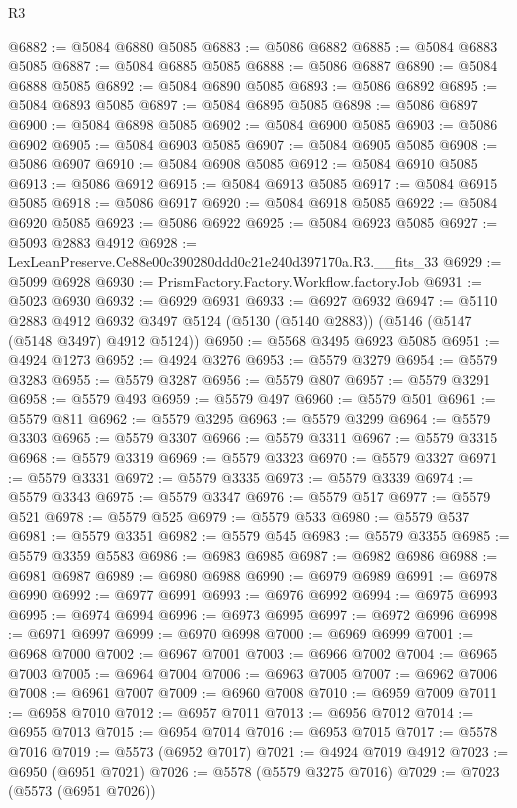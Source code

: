 \begin{lexlean}{R3}
\begin{coremodule}
@6882 := @5084 @6880 @5085
@6883 := @5086 @6882
@6885 := @5084 @6883 @5085
@6887 := @5084 @6885 @5085
@6888 := @5086 @6887
@6890 := @5084 @6888 @5085
@6892 := @5084 @6890 @5085
@6893 := @5086 @6892
@6895 := @5084 @6893 @5085
@6897 := @5084 @6895 @5085
@6898 := @5086 @6897
@6900 := @5084 @6898 @5085
@6902 := @5084 @6900 @5085
@6903 := @5086 @6902
@6905 := @5084 @6903 @5085
@6907 := @5084 @6905 @5085
@6908 := @5086 @6907
@6910 := @5084 @6908 @5085
@6912 := @5084 @6910 @5085
@6913 := @5086 @6912
@6915 := @5084 @6913 @5085
@6917 := @5084 @6915 @5085
@6918 := @5086 @6917
@6920 := @5084 @6918 @5085
@6922 := @5084 @6920 @5085
@6923 := @5086 @6922
@6925 := @5084 @6923 @5085
@6927 := @5093 @2883 @4912
@6928 := LexLeanPreserve.Ce88e00c390280ddd0c21e240d397170a.R3.__fits_33
@6929 := @5099 @6928
@6930 := PrismFactory.Factory.Workflow.factoryJob
@6931 := @5023 @6930
@6932 := @6929 @6931
@6933 := @6927 @6932
@6947 := @5110
    @2883
    @4912
    @6932
    @3497
    @5124
    (@5130 (@5140 @2883))
    (@5146 (@5147 (@5148 @3497) @4912 @5124))
@6950 := @5568 @3495 @6923 @5085
@6951 := @4924 @1273
@6952 := @4924 @3276
@6953 := @5579 @3279
@6954 := @5579 @3283
@6955 := @5579 @3287
@6956 := @5579 @807
@6957 := @5579 @3291
@6958 := @5579 @493
@6959 := @5579 @497
@6960 := @5579 @501
@6961 := @5579 @811
@6962 := @5579 @3295
@6963 := @5579 @3299
@6964 := @5579 @3303
@6965 := @5579 @3307
@6966 := @5579 @3311
@6967 := @5579 @3315
@6968 := @5579 @3319
@6969 := @5579 @3323
@6970 := @5579 @3327
@6971 := @5579 @3331
@6972 := @5579 @3335
@6973 := @5579 @3339
@6974 := @5579 @3343
@6975 := @5579 @3347
@6976 := @5579 @517
@6977 := @5579 @521
@6978 := @5579 @525
@6979 := @5579 @533
@6980 := @5579 @537
@6981 := @5579 @3351
@6982 := @5579 @545
@6983 := @5579 @3355
@6985 := @5579 @3359 @5583
@6986 := @6983 @6985
@6987 := @6982 @6986
@6988 := @6981 @6987
@6989 := @6980 @6988
@6990 := @6979 @6989
@6991 := @6978 @6990
@6992 := @6977 @6991
@6993 := @6976 @6992
@6994 := @6975 @6993
@6995 := @6974 @6994
@6996 := @6973 @6995
@6997 := @6972 @6996
@6998 := @6971 @6997
@6999 := @6970 @6998
@7000 := @6969 @6999
@7001 := @6968 @7000
@7002 := @6967 @7001
@7003 := @6966 @7002
@7004 := @6965 @7003
@7005 := @6964 @7004
@7006 := @6963 @7005
@7007 := @6962 @7006
@7008 := @6961 @7007
@7009 := @6960 @7008
@7010 := @6959 @7009
@7011 := @6958 @7010
@7012 := @6957 @7011
@7013 := @6956 @7012
@7014 := @6955 @7013
@7015 := @6954 @7014
@7016 := @6953 @7015
@7017 := @5578 @7016
@7019 := @5573 (@6952 @7017)
@7021 := @4924 @7019 @4912
@7023 := @6950 (@6951 @7021)
@7026 := @5578 (@5579 @3275 @7016)
@7029 := @7023 (@5573 (@6951 @7026))

\end{coremodule}
\end{lexlean}
